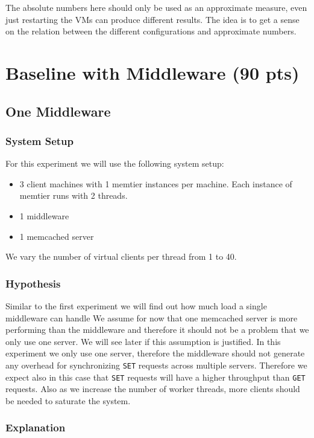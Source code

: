 \documentclass[11pt,a4paper]{article}
\begin{document}
%
The absolute numbers here should only be used as an approximate measure, even just restarting the VMs can produce different results. 
%
The idea is to get a sense on the relation between the different configurations and approximate numbers.
%
\section{Baseline with Middleware (90 pts)}
%
\subsection{One Middleware}
%
\subsubsection{System Setup}
%
For this experiment we will use the following system setup:
%
\begin{itemize}
	\item 3 client machines with 1 memtier instances per machine. Each instance of memtier runs with 2 threads.
	\item 1 middleware
	\item 1 memcached server
\end{itemize}
%
We vary the number of virtual clients per thread from 1 to 40.
%
\subsubsection{Hypothesis}
%
Similar to the first experiment we will find out how much load a single middleware can handle
%
We assume for now that one memcached server is more performing than the middleware and therefore it should not be a problem that we only use one server.
%
We will see later if this assumption is justified.
%
In this experiment we only use one server, therefore the middleware should not generate any overhead for synchronizing \texttt{SET} requests across multiple servers.
%
Therefore we expect also in this case that \texttt{SET} requests will have a higher throughput than \texttt{GET} requests.
%
Also as we increase the number of worker threads, more clients should be needed to saturate the system.
%
\subsubsection{Explanation}\label{subsec:one_middleware_explanation}
%
\end{document}
